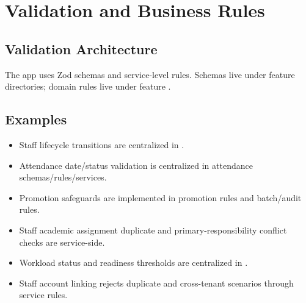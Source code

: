 \chapter{Validation and Business Rules}
\section{Validation Architecture}
The app uses Zod schemas and service-level rules. Schemas live under feature  directories; domain rules live under feature .

\section{Examples}
\begin{itemize}
\item Staff lifecycle transitions are centralized in .
\item Attendance date/status validation is centralized in attendance schemas/rules/services.
\item Promotion safeguards are implemented in promotion rules and batch/audit rules.
\item Staff academic assignment duplicate and primary-responsibility conflict checks are service-side.
\item Workload status and readiness thresholds are centralized in .
\item Staff account linking rejects duplicate and cross-tenant scenarios through service rules.
\end{itemize}
